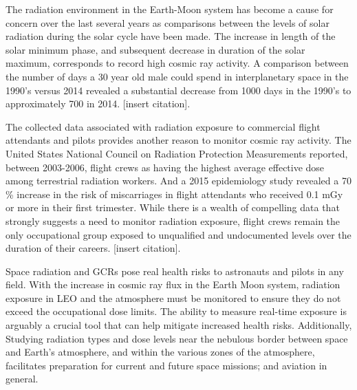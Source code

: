 


The radiation environment in the Earth-Moon system has become a cause for concern over the last several years as comparisons between the levels of solar radiation during the solar cycle have been made. The increase in length of the solar minimum phase, and subsequent decrease in duration of the solar maximum, corresponds to record high cosmic ray activity.  A comparison between the number of days a 30 year old male could spend in interplanetary space in the 1990's versus 2014 revealed a substantial decrease from 1000 days in the 1990's to approximately 700 in 2014. [insert citation].

The collected data associated with radiation exposure to commercial flight attendants and pilots provides another reason to monitor cosmic ray activity.  The United States National Council on Radiation Protection Measurements reported, between 2003-2006, flight crews as having the highest average effective dose among terrestrial radiation workers.  And a 2015 epidemiology study revealed a 70 \% increase in the risk of miscarriages in flight attendants who received 0.1 mGy or more in their first trimester.  While there is a wealth of compelling data that strongly suggests a need to monitor radiation exposure, flight crews remain the only occupational group exposed to unqualified and undocumented levels over the duration of their careers. [insert citation].     

Space radiation and GCRs pose real health risks to astronauts and  pilots in any field.  With the increase in cosmic ray flux in the Earth Moon system, radiation exposure in LEO and the atmosphere must be monitored to ensure they do not exceed the occupational dose limits.  The ability to measure real-time exposure is arguably a crucial tool that can help mitigate increased health risks.  Additionally, Studying radiation types and dose levels near the nebulous border between space and Earth's atmosphere, and within the various zones of the atmosphere, facilitates preparation for current and future space missions; and aviation in general. 

%



